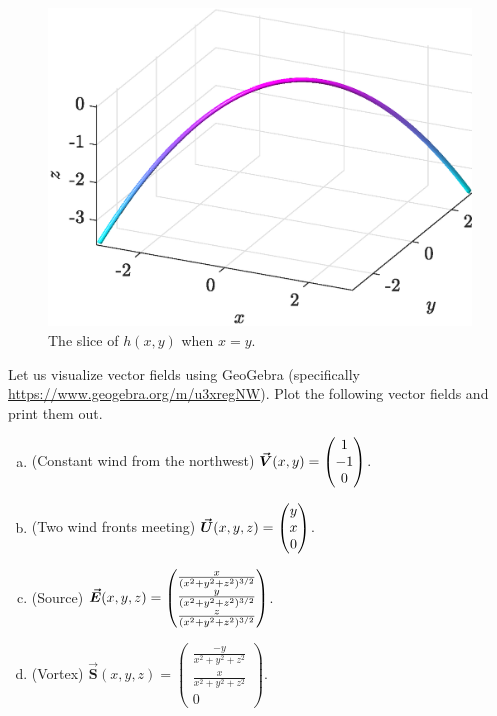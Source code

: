 \documentclass[12pt]{article} %
\begin{document}
\begin{solution}
\begin{enumerate}[(a)]
\begin{figure}[H]
        \centering
        \includegraphics[width=.8\textwidth]{figures/3c_x=y}
        \caption{The slice of $h(x,y)$ when $x=y$.}
    \end{figure}
\end{enumerate}
\end{solution}

\newpage
\begin{problem}
Let us visualize vector fields using GeoGebra (specifically \url{https://www.geogebra.org/m/u3xregNW}). Plot the following vector fields and print them out.
\begin{enumerate}[(a)]
    \item (Constant wind from the northwest) $\boldsymbol{\vec{V}}(x,y)=\begin{pmatrix} 1 \\ -1 \\ 0\end{pmatrix}$.
    \item (Two wind fronts meeting) $\boldsymbol{\vec{U}}(x,y,z)=\begin{pmatrix} y \\ x \\ 0 \end{pmatrix}$.
    \item (Source) $\boldsymbol{\vec{E}}(x,y,z) = \begin{pmatrix} \frac{x}{(x^2+y^2+z^2)^{3/2}} \\ \frac{y}{(x^2+y^2+z^2)^{3/2}} \\ \frac{z}{(x^2+y^2+z^2)^{3/2}} \end{pmatrix}$.
    \item (Vortex) $\boldsymbol{\vec{S}}(x,y,z)=\begin{pmatrix} \frac{-y}{x^2+y^2+z^2} \\ \frac{x}{x^2+y^2+z^2} \\ 0\end{pmatrix}.$
\end{enumerate}
\end{problem}
\end{document}
